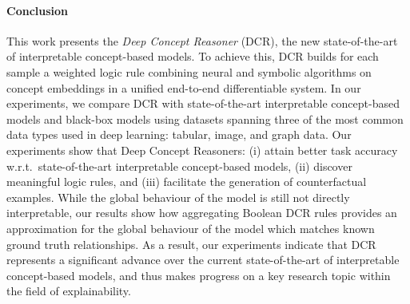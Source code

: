 


\paragraph{Conclusion}
This work presents the \textit{Deep Concept Reasoner} (DCR), the new state-of-the-art of interpretable concept-based models. To achieve this, DCR builds for each sample a weighted logic rule combining neural and symbolic algorithms on concept embeddings in a unified end-to-end differentiable system. In our experiments, we compare DCR with state-of-the-art interpretable concept-based models and black-box models using datasets spanning three of the most common data types used in deep learning: tabular, image, and graph data. 
Our experiments show that Deep Concept Reasoners: (i) attain better task accuracy w.r.t.\ state-of-the-art interpretable concept-based models, (ii) discover meaningful logic rules, and (iii) facilitate the generation of counterfactual examples. 
While the global behaviour of the model is still not directly interpretable, our results show how aggregating Boolean DCR rules provides an approximation for the global behaviour of the model which matches known ground truth relationships. As a result, our experiments indicate that DCR represents a significant advance over the current state-of-the-art of interpretable concept-based models, and thus makes progress on a key research topic within the field of explainability.
